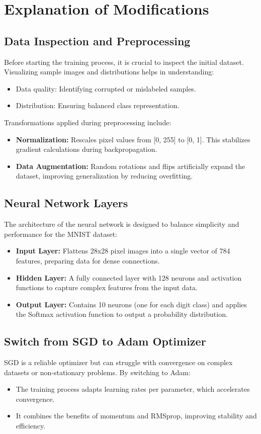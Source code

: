 \documentclass{article}
\begin{document}
\section*{Explanation of Modifications}

\subsection*{Data Inspection and Preprocessing}
Before starting the training process, it is crucial to inspect the initial dataset. Visualizing sample images and distributions helps in understanding:
\begin{itemize}
    \item Data quality: Identifying corrupted or mislabeled samples.
    \item Distribution: Ensuring balanced class representation.
\end{itemize}

Transformations applied during preprocessing include:
\begin{itemize}
    \item \textbf{Normalization:} Rescales pixel values from [0, 255] to [0, 1]. This stabilizes gradient calculations during backpropagation.
    \item \textbf{Data Augmentation:} Random rotations and flips artificially expand the dataset, improving generalization by reducing overfitting.
\end{itemize}

\subsection*{Neural Network Layers}
The architecture of the neural network is designed to balance simplicity and performance for the MNIST dataset:
\begin{itemize}
    \item \textbf{Input Layer:} Flattens 28x28 pixel images into a single vector of 784 features, preparing data for dense connections.
    \item \textbf{Hidden Layer:} A fully connected layer with 128 neurons and activation functions to capture complex features from the input data.
    \item \textbf{Output Layer:} Contains 10 neurons (one for each digit class) and applies the Softmax activation function to output a probability distribution.
\end{itemize}

\subsection*{Switch from SGD to Adam Optimizer}
SGD is a reliable optimizer but can struggle with convergence on complex datasets or non-stationary problems. By switching to Adam:
\begin{itemize}
    \item The training process adapts learning rates per parameter, which accelerates convergence.
    \item It combines the benefits of momentum and RMSprop, improving stability and efficiency.
\end{itemize}
\end{document}
